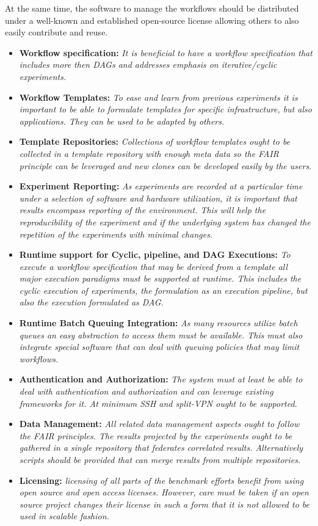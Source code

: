 \documentclass[sigconf]{acmart}
\begin{document}
At the same time, the software to manage the workflows should be distributed under a well-known and established open-source license allowing others to also easily contribute and reuse. 

\begin{BOX}

\begin{itemize}

\item {\bf Workflow specification:} {\it It is beneficial to have a workflow specification that includes more then DAGs and addresses emphasis on iterative/cyclic experiments.}
\item {\bf Workflow Templates:} {\it To ease and learn from previous experiments it is important to be able to formulate templates for specific infrastructure, but also applications. They can be used to be adapted by others.}
\item {\bf Template Repositories:} {\it Collections of workflow templates ought to be collected in a template repository with enough meta data so the FAIR principle can be leveraged and new clones can be developed easily by the users.}
\item {\bf Experiment Reporting:} {\it As experiments are recorded at a particular time under a selection of software and hardware utilization, it is important that results encompass reporting of the environment. This will help the reproducibility of the experiment and if the underlying system has changed the repetition of the experiments with minimal changes.}
\item {\bf Runtime support for Cyclic, pipeline, and DAG Executions:} {\it To execute a workflow specification that may be derived from a template all major execution paradigms must be supported at runtime. This includes the cyclic execution of experiments, the formulation as an execution pipeline, but also  the execution formulated as DAG.}
\item {\bf Runtime Batch Queuing Integration:} {\it As many resources utilize batch queues an easy abstraction to access them must be available. This must also integrate special software that can deal with queuing policies that may limit workflows. }
\item {\bf Authentication and Authorization:} {\it The system must at least be able to deal with authentication and authorization and can leverage existing frameworks for it. At minimum SSH and split-VPN ought to be supported.}
\item {\bf Data Management:} {\it All related data management aspects ought to follow the FAIR principles. The results projected by the experiments ought to be gathered in a single repository that federates correlated results. Alternatively scripts should be provided that can merge results from multiple repositories.}
\item {\bf Licensing:} {\it licensing of all parts of the benchmark efforts benefit from using open source and open access licenses. However, care must be taken if an open source project changes their license in such a form that it is not allowed to be used in scalable fashion.}
\end{itemize}
    

\end{BOX}
\end{document}
